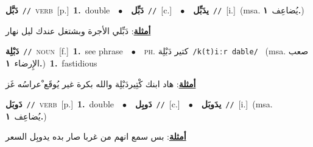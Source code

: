 \documentclass[10pt,a4paper,twoside]{article} %
\begin{document}
\begin{multicols}{2}
{\setlength\topsep{0pt}\textbf{\foreignlanguage{arabic}{دَبَّل}}\ {\color{gray}\texttt{//}\color{black}}\ \textsc{verb}\ [p.]\ \textbf{1.}~double\ \ $\bullet$\ \ \setlength\topsep{0pt}\textbf{\foreignlanguage{arabic}{دَبِّل}}\ {\color{gray}\texttt{//}\color{black}}\ [c.]\ \ $\bullet$\ \ \setlength\topsep{0pt}\textbf{\foreignlanguage{arabic}{يدَبِّل}}\ {\color{gray}\texttt{//}\color{black}}\ [i.]\ \color{gray}(msa. \foreignlanguage{arabic}{يُضاعِف}~\foreignlanguage{arabic}{\textbf{١.}})\color{black}\  \begin{flushright}\color{gray}\foreignlanguage{arabic}{\textbf{\underline{\foreignlanguage{arabic}{أمثلة}}}: دَبِّلي الأجرة وبشتغل عندك ليل نهار}\end{flushright}\color{black}} \vspace{2mm}

{\setlength\topsep{0pt}\textbf{\foreignlanguage{arabic}{دَبْلِة}}\ {\color{gray}\texttt{//}\color{black}}\ \textsc{noun}\ [f.]\ \textbf{1.}~see phrase\ \ $\bullet$\ \ \textsc{ph.} \color{gray} \foreignlanguage{arabic}{كتير دَبْلِة}\color{black}\ {\color{gray}\texttt{/{\sffamily k(t)iːr dable}/}\color{black}}\ \color{gray} (msa. \foreignlanguage{arabic}{صعب الإِرضاء}~\foreignlanguage{arabic}{\textbf{١.}})\color{black}\ \textbf{1.}~fastidious\  \begin{flushright}\color{gray}\foreignlanguage{arabic}{\textbf{\underline{\foreignlanguage{arabic}{أمثلة}}}: هاد ابنك كْتِيردَبْلِة والله بكرة غير يُوقَع ْعراسُه غَز}\end{flushright}\color{black}} \vspace{2mm}

{\setlength\topsep{0pt}\textbf{\foreignlanguage{arabic}{دَوبَل}}\ {\color{gray}\texttt{//}\color{black}}\ \textsc{verb}\ [p.]\ \textbf{1.}~double\ \ $\bullet$\ \ \setlength\topsep{0pt}\textbf{\foreignlanguage{arabic}{دَوبِل}}\ {\color{gray}\texttt{//}\color{black}}\ [c.]\ \ $\bullet$\ \ \setlength\topsep{0pt}\textbf{\foreignlanguage{arabic}{يدَوبَل}}\ {\color{gray}\texttt{//}\color{black}}\ [i.]\ \color{gray}(msa. \foreignlanguage{arabic}{يُضاعِف}~\foreignlanguage{arabic}{\textbf{١.}})\color{black}\  \begin{flushright}\color{gray}\foreignlanguage{arabic}{\textbf{\underline{\foreignlanguage{arabic}{أمثلة}}}: بس سمع انهم من غربا صار بده يدوبِل السعر}\end{flushright}\color{black}} \vspace{2mm}


\end{multicols}
\end{document}
